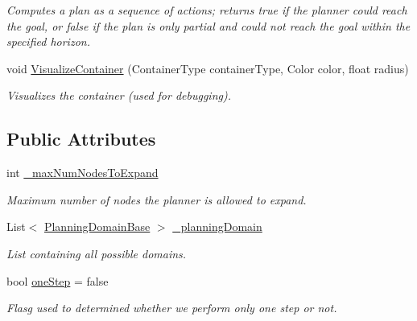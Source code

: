 \begin{DoxyCompactItemize}
\begin{DoxyCompactList}\small\item\em Computes a plan as a sequence of actions; returns true if the planner could reach the goal, or false if the plan is only partial and could not reach the goal within the specified horizon. \end{DoxyCompactList}\item 
void \hyperlink{class_best_first_search_planner_af0e16fec4b04283bf4da46b5dcd6efe3}{Visualize\-Container} (Container\-Type container\-Type, Color color, float radius)
\begin{DoxyCompactList}\small\item\em Visualizes the container (used for debugging). \end{DoxyCompactList}\end{DoxyCompactItemize}
\subsection*{Public Attributes}
\begin{DoxyCompactItemize}
\item 
\hypertarget{class_best_first_search_planner_a6cf3eaf1dece9104e57734fe46dc5c18}{int \hyperlink{class_best_first_search_planner_a6cf3eaf1dece9104e57734fe46dc5c18}{\-\_\-max\-Num\-Nodes\-To\-Expand}}\label{class_best_first_search_planner_a6cf3eaf1dece9104e57734fe46dc5c18}

\begin{DoxyCompactList}\small\item\em Maximum number of nodes the planner is allowed to expand. \end{DoxyCompactList}\item 
\hypertarget{class_best_first_search_planner_a1ad8d9c366c660e9f9713118abdd9274}{List$<$ \hyperlink{class_planning_domain_base}{Planning\-Domain\-Base} $>$ \hyperlink{class_best_first_search_planner_a1ad8d9c366c660e9f9713118abdd9274}{\-\_\-planning\-Domain}}\label{class_best_first_search_planner_a1ad8d9c366c660e9f9713118abdd9274}

\begin{DoxyCompactList}\small\item\em List containing all possible domains. \end{DoxyCompactList}\item 
\hypertarget{class_best_first_search_planner_a257de3dcc541f70ef5be8bcb63ce8471}{bool \hyperlink{class_best_first_search_planner_a257de3dcc541f70ef5be8bcb63ce8471}{one\-Step} = false}\label{class_best_first_search_planner_a257de3dcc541f70ef5be8bcb63ce8471}

\begin{DoxyCompactList}\small\item\em Flasg used to determined whether we perform only one step or not. \end{DoxyCompactList}\end{DoxyCompactItemize}


